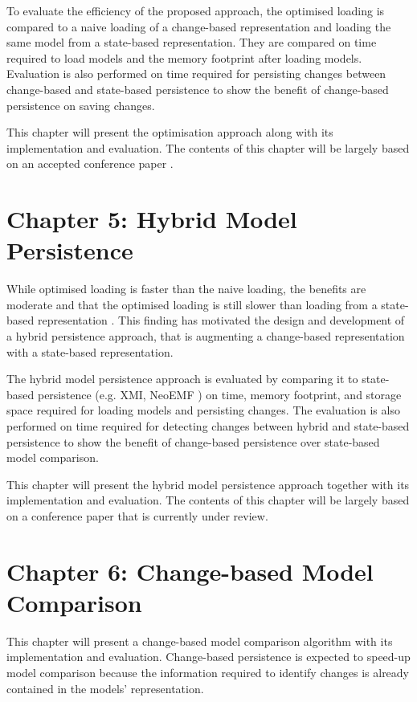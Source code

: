 \documentclass[12pt, a4paper]{report} \usepackage[titletoc]{appendix}
\begin{document}
To evaluate the efficiency of the proposed approach, the optimised loading is compared to a naive loading of a change-based representation and loading the same model from a state-based representation. They are compared on time required to load models and the memory footprint after loading models. Evaluation is also performed on time required for persisting changes between change-based and state-based persistence to show the benefit of change-based persistence on saving changes. 

This chapter will present the optimisation approach along with its implementation and evaluation. The contents of this chapter will be largely based on an accepted conference paper \cite{yohannis2018towards}. 


\section{Chapter 5: Hybrid Model Persistence}
\label{sec:chapter_5_hybrid_model_persistence}
While optimised loading is faster than the naive loading, the benefits are moderate and that the optimised loading is still slower than loading from a state-based representation \cite{yohannis2018towards}. This finding has motivated the design and development of a hybrid persistence approach, that is augmenting a change-based representation with a state-based representation. 

The hybrid model persistence approach is evaluated by comparing it to state-based persistence (e.g. XMI, NeoEMF \cite{daniel2016neoemf}) on time, memory footprint, and storage space required for loading models and persisting changes. The evaluation is also performed on time required for detecting changes between hybrid and state-based persistence to show the benefit of change-based persistence over state-based model comparison. 

This chapter will present the hybrid model persistence approach together with its implementation and evaluation. The contents of this chapter will be largely based on a conference paper \cite{yohannis2018hybrid} that is currently under review. 

\section{Chapter 6: Change-based Model Comparison}
\label{sec:chapter_6_change_based_model_comparison}
This chapter will present a change-based model comparison algorithm with its implementation and evaluation. Change-based persistence is expected to speed-up model comparison because the information required to identify changes is already contained in the models' representation. 
\end{document}
